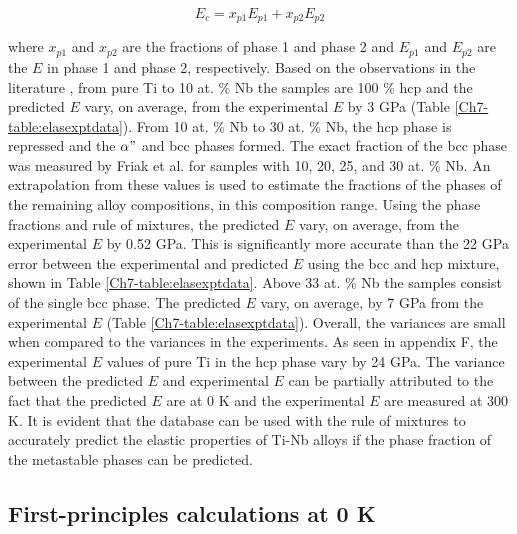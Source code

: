 \begin{equation}
\label{eq:ruleofmix}
E_{c}=x_{p1}E_{p1}+x_{p2}E_{p2}
\end{equation}

\noindent where $x_{p1}$ and $x_{p2}$ are the fractions of phase 1 and phase 2 and $E_{p1}$ and $E_{p2}$ are the $E$ in phase 1 and phase 2, respectively. Based on the observations in the literature \cite{Friak2012,Timoshevskii2011,Friak2012,Karre2015}, from pure Ti to 10 at. \% Nb the samples are 100 \% hcp and the predicted $E$ vary, on average, from the experimental $E$ by 3 GPa (Table \ref{Ch7-table:elasexptdata}). From 10 at. \% Nb to 30 at. \% Nb, the hcp phase is repressed and the $\alpha"$ and bcc phases formed. The exact fraction of the bcc phase was measured by Friak et al. \cite{Friak2012} for samples with 10, 20, 25, and 30 at. \% Nb. An extrapolation from these values is used to estimate the fractions of the phases of the remaining alloy compositions, in this composition range. Using the phase fractions and rule of mixtures, the predicted $E$ vary, on average, from the experimental $E$ by 0.52 GPa. This is significantly more accurate than the 22 GPa error between the experimental and predicted $E$ using the bcc and hcp mixture, shown in Table \ref{Ch7-table:elasexptdata}. Above 33 at. \% Nb the samples consist of the single bcc phase. The predicted $E$ vary, on average, by 7 GPa from the experimental $E$ (Table \ref{Ch7-table:elasexptdata}). Overall, the variances are small when compared to the variances in the experiments. As seen in appendix F, the experimental $E$ values of pure Ti in the hcp phase vary by 24 GPa. The variance between the predicted $E$ and experimental $E$ can be partially attributed to the fact that the predicted $E$ are at 0 K and the experimental $E$ are measured at 300 K. It is evident that the database can be used with the rule of mixtures to accurately predict the elastic properties of Ti-Nb alloys if the phase fraction of the metastable phases can be predicted.

\subsection{First-principles calculations at 0 K}

